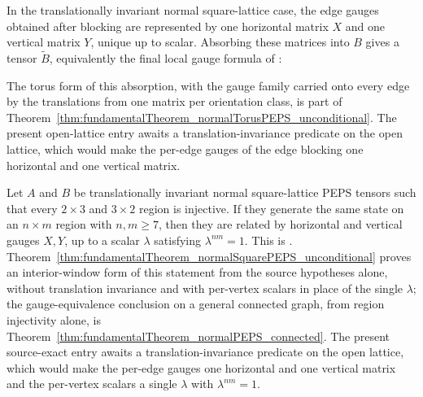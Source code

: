 \begin{theorem}%
    \label{thm:peps_tiNormalGaugeAbsorption}
    \notready
    In the translationally invariant normal square-lattice case, the edge
    gauges obtained after blocking are represented by one horizontal matrix
    $X$ and one vertical matrix $Y$, unique up to scalar. Absorbing these
    matrices into $B$ gives a tensor $\widetilde B$, equivalently the final
    local gauge formula of \cite[Theorem~3]{Molnar2018NormalPEPS}:
    \begin{center}
        \TNPEPSTINormalGaugeAbsorption
    \end{center}
    The torus form of this absorption, with the gauge family carried onto
    every edge by the translations from one matrix per orientation class, is
    part of Theorem~\ref{thm:fundamentalTheorem_normalTorusPEPS_unconditional}.
    The present open-lattice entry awaits a translation-invariance predicate
    on the open lattice, which would make the per-edge gauges of the edge
    blocking one horizontal and one vertical matrix.
\end{theorem}

\begin{theorem}%
    \label{thm:fundamentalTheorem_normalSquarePEPS}
    \notready
    Let $A$ and $B$ be translationally invariant normal square-lattice PEPS
    tensors such that every $2\times 3$ and $3\times 2$ region is
    injective. If they generate the same state on an $n\times m$ region with
    $n,m\geq 7$, then they are related by horizontal and vertical gauges
    $X,Y$, up to a scalar $\lambda$ satisfying
    $\lambda^{nm}=1$. This is
    \cite[Theorem~3]{Molnar2018NormalPEPS}.
    Theorem~\ref{thm:fundamentalTheorem_normalSquarePEPS_unconditional} proves
    an interior-window form of this statement from the source hypotheses alone,
    without translation invariance and with per-vertex scalars in place of the
    single $\lambda$; the gauge-equivalence conclusion on a general connected
    graph, from region injectivity alone, is
    Theorem~\ref{thm:fundamentalTheorem_normalPEPS_connected}. The present
    source-exact entry awaits a translation-invariance predicate on the open
    lattice, which would make the per-edge gauges one horizontal and one
    vertical matrix and the per-vertex scalars a single $\lambda$ with
    $\lambda^{nm}=1$.
\end{theorem}

